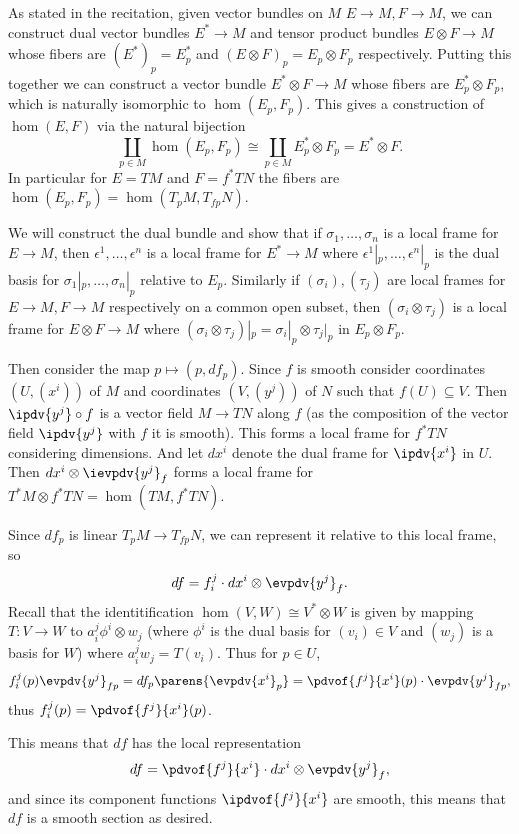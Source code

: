     \item As stated in the recitation, given vector bundles on $M$ $E\to M,F\to M$, we can construct dual vector bundles $E^*\to M$ and tensor product bundles $E\otimes F\to M$
    whose fibers are $(E^*)_p=E^*_p$ and $(E\otimes F)_p=E_p\otimes F_p$ respectively.
    Putting this together we can construct a vector bundle $E^*\otimes F\to M$ whose fibers are $E^*_p\otimes F_p$, which is naturally isomorphic to $\hom(E_p,F_p)$.
    This gives a construction of $\hom(E,F)$ via the natural bijection
    $$ \coprod_{p\in M}\hom(E_p,F_p) \cong \coprod_{p\in M}E_p^*\otimes F_p = E^*\otimes F . $$
    In particular for $E=TM$ and $F=f^*TN$ the fibers are $\hom(E_p,F_p)=\hom(T_pM,T_{fp}N)$.
 
    We will construct the dual bundle and show that if $\sigma_1,\dots,\sigma_n$ is a local frame for $E\to M$, then $\epsilon^1,\dots,\epsilon^n$ is a local frame for $E^*\to M$
    where $\epsilon^1|_p,\dots,\epsilon^n|_p$ is the dual basis for $\sigma_1|_p,\dots,\sigma_n|_p$ relative to $E_p$.
    Similarly if $(\sigma_i),(\tau_j)$ are local frames for $E\to M,F\to M$ respectively on a common open subset, then $(\sigma_i\otimes\tau_j)$ is a local frame for $E\otimes F\to M$
    where $(\sigma_i\otimes\tau_j)|_p=\sigma_i|_p\otimes\tau_j|_p$ in $E_p\otimes F_p$.

    Then consider the map $p\mapsto(p,df_p)$.
    Since $f$ is smooth consider coordinates $(U,(x^i))$ of $M$ and coordinates $(V,(y^j))$ of $N$ such that $f(U)\subseteq V$.
    Then $\ipdv{y^j}\circ f$ is a vector field $M\to TN$ along $f$ (as the composition of the vector field $\ipdv{y^j}$ with $f$ it is smooth).
    This forms a local frame for $f^*TN$ considering dimensions.
    And let $dx^i$ denote the dual frame for $\ipdv{x^i}$ in $U$.
    Then $dx^i\otimes\ievpdv{y^j}_f$ forms a local frame for $T^*M\otimes f^*TN=\hom(TM,f^*TN)$.

    Since $df_p$ is linear $T_pM\to T_{fp}N$, we can represent it relative to this local frame, so
    $$ df = f^j_i\cdot dx^i\otimes\evpdv{y^j}_f . $$
    Recall that the identitification $\hom(V,W)\cong V^*\otimes W$ is given by mapping $T\colon V\to W$ to $a^j_i\phi^i\otimes w_j$ (where $\phi^i$ is the dual basis for $(v_i)\in V$ and $(w_j)$ is a basis for $W$)
    where $a^j_iw_j=T(v_i)$.
    Thus for $p\in U$,
    $$ f^j_i(p)\evpdv{y^j}_{fp} = df_p\parens{\evpdv{x^i}_p} = \pdvof{f^j}{x^i}(p)\cdot\evpdv{y^j}_{fp} , $$
    thus $f^j_i(p)=\pdvof{f^j}{x^i}(p)$.

    This means that $df$ has the local representation
    $$ df = \pdvof{f^j}{x^i}\cdot dx^i\otimes\evpdv{y^j}_f , $$
    and since its component functions $\ipdvof{f^j}{x^i}$ are smooth, this means that $df$ is a smooth section as desired.

